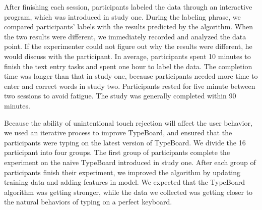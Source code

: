 
After finishing each session, participants labeled the data through an interactive program, which was introduced in study one. During the labeling phrase, we compared participants' labels with the results predicted by the algorithm. When the two results were different, we immediately recorded and analyzed the data point. If the experimenter could not figure out why the results were different, he would discuss with the participant.
In average, participants spent 10 minutes to finish the text entry tasks and spent one hour to label the data. The completion time was longer than that in study one, because participants needed more time to enter and correct words in study two. Participants rested for five minute between two sessions to avoid fatigue. The study was generally completed within 90 minutes.



Because the ability of unintentional touch rejection will affect the user behavior, we used an iterative process to improve TypeBoard, and ensured that the participants were typing on the latest version of TypeBoard. We divide the 16 participant into four groups. The first group of participants complete the experiment on the naive TypeBoard introduced in study one. After each group of participants finish their experiment, we improved the algorithm by updating training data and adding features in model. We expected that the TypeBoard algorithm was getting stronger, while the data we collected was getting closer to the natural behaviors of typing on a perfect keyboard.


